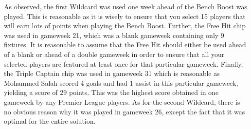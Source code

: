 As observed, the first Wildcard was used one week ahead of the Bench Boost was played. This is reasonable as it is wisely to ensure that you select 15 players that will earn lots of points when playing the Bench Boost. Further, the Free Hit chip was used in gameweek 21, which was a blank gameweek containing only 9 fixtures. It is reasonable to assume that the Free Hit should either be used ahead of a blank or ahead of a double gameweek in order to ensure that all your selected players are featured at least once for that particular gameweek. Finally, the Triple Captain chip was used in gameweek 31 which is reasonable as Mohammed Salah scored 4 goals and had 1 assist in this particular gameweek, yielding a score of 29 points. This was the highest score obtained in one gameweek by any Premier League players. As for the second Wildcard, there is no obvious reason why it was played in gameweek 26, except the fact that it was optimal for the entire solution. 
\newpar

